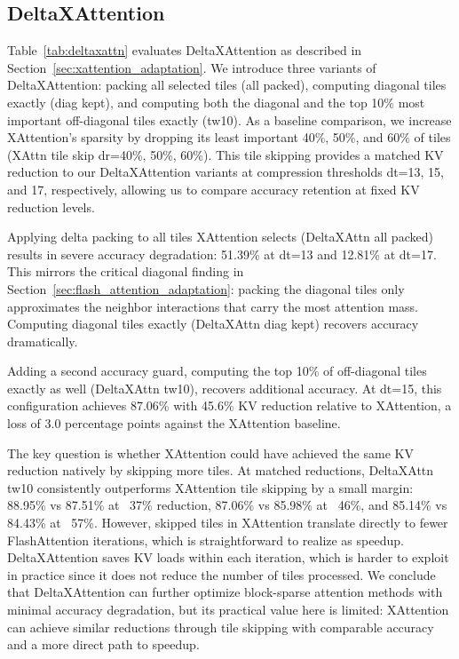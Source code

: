 \subsection{DeltaXAttention}

Table~\ref{tab:deltaxattn} evaluates DeltaXAttention as described in Section~\ref{sec:xattention_adaptation}. We introduce three variants of DeltaXAttention: packing all selected tiles (all packed), computing diagonal tiles exactly (diag kept), and computing both the diagonal and the top 10\% most important off-diagonal tiles exactly (tw10). As a baseline comparison, we increase XAttention's sparsity by dropping its least important 40\%, 50\%, and 60\% of tiles (XAttn tile skip dr=40\%, 50\%, 60\%). This tile skipping provides a matched KV reduction to our DeltaXAttention variants at compression thresholds dt=13, 15, and 17, respectively, allowing us to compare accuracy retention at fixed KV reduction levels.

Applying delta packing to all tiles XAttention selects (DeltaXAttn all packed) results in severe accuracy degradation: 51.39\% at dt=13 and 12.81\% at dt=17. This mirrors the critical diagonal finding in Section~\ref{sec:flash_attention_adaptation}: packing the diagonal tiles only approximates the neighbor interactions that carry the most attention mass. Computing diagonal tiles exactly (DeltaXAttn diag kept) recovers accuracy dramatically.

Adding a second accuracy guard, computing the top 10\% of off-diagonal tiles exactly as well (DeltaXAttn tw10), recovers additional accuracy. At dt=15, this configuration achieves 87.06\% with 45.6\% KV reduction relative to XAttention, a loss of 3.0 percentage points against the XAttention baseline.

The key question is whether XAttention could have achieved the same KV reduction natively by skipping more tiles. At matched reductions, DeltaXAttn tw10 consistently outperforms XAttention tile skipping by a small margin: 88.95\% vs 87.51\% at ~37\% reduction, 87.06\% vs 85.98\% at ~46\%, and 85.14\% vs 84.43\% at ~57\%. However, skipped tiles in XAttention translate directly to fewer FlashAttention iterations, which is straightforward to realize as speedup. DeltaXAttention saves KV loads within each iteration, which is harder to exploit in practice since it does not reduce the number of tiles processed. We conclude that DeltaXAttention can further optimize block-sparse attention methods with minimal accuracy degradation, but its practical value here is limited: XAttention can achieve similar reductions through tile skipping with comparable accuracy and a more direct path to speedup.



